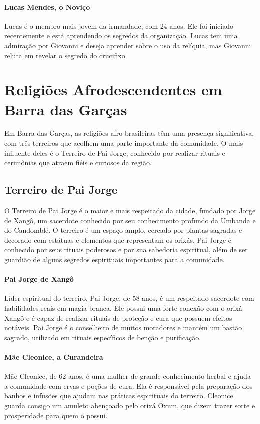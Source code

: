 \paragraph{Lucas Mendes, o Noviço}  
Lucas é o membro mais jovem da irmandade, com 24 anos. Ele foi iniciado recentemente e está aprendendo os segredos da organização. Lucas tem uma admiração por Giovanni e deseja aprender sobre o uso da relíquia, mas Giovanni reluta em revelar o segredo do crucifixo.

\section{Religiões Afrodescendentes em Barra das Garças}

Em Barra das Garças, as religiões afro-brasileiras têm uma presença significativa, com três terreiros que acolhem uma parte importante da comunidade. O mais influente deles é o Terreiro de Pai Jorge, conhecido por realizar rituais e cerimônias que atraem fiéis e curiosos da região.

\subsection{Terreiro de Pai Jorge}

O Terreiro de Pai Jorge é o maior e mais respeitado da cidade, fundado por Jorge de Xangô, um sacerdote conhecido por seu conhecimento profundo da Umbanda e do Candomblé. O terreiro é um espaço amplo, cercado por plantas sagradas e decorado com estátuas e elementos que representam os orixás. Pai Jorge é conhecido por seus rituais poderosos e por sua sabedoria espiritual, além de ser guardião de alguns segredos espirituais importantes para a comunidade.

\paragraph{Pai Jorge de Xangô}  
Líder espiritual do terreiro, Pai Jorge, de 58 anos, é um respeitado sacerdote com habilidades reais em magia branca. Ele possui uma forte conexão com o orixá Xangô e é capaz de realizar rituais de proteção e cura que possuem efeitos notáveis. Pai Jorge é o conselheiro de muitos moradores e mantém um bastão sagrado, utilizado em rituais específicos de benção e purificação.

\paragraph{Mãe Cleonice, a Curandeira}  
Mãe Cleonice, de 62 anos, é uma mulher de grande conhecimento herbal e ajuda a comunidade com ervas e poções de cura. Ela é responsável pela preparação dos banhos e infusões que ajudam nas práticas espirituais do terreiro. Cleonice guarda consigo um amuleto abençoado pelo orixá Oxum, que dizem trazer sorte e prosperidade para quem o possui.

